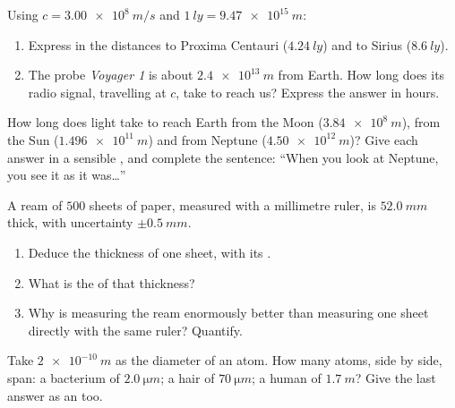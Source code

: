 \begin{exercise}[$\star\star$]\label{exo:g10:orders-of-magnitude:6}
Using $c = \qty{3.00e8}{m/s}$ and $\qty{1}{ly} = \qty{9.47e15}{m}$:
\begin{enumerate}
  \item Express in  the distances to Proxima Centauri
        ($\qty{4.24}{ly}$) and to Sirius ($\qty{8.6}{ly}$).
  \item The probe \emph{Voyager 1} is about $\qty{2.4e13}{m}$ from
        Earth. How long does its radio signal, travelling at $c$, take
        to reach us? Express the answer in hours.
\end{enumerate}
\end{exercise}

\begin{exercise}[$\star\star$]\label{exo:g10:orders-of-magnitude:7}
How long does light take to reach Earth from the Moon
($\qty{3.84e8}{m}$), from the Sun ($\qty{1.496e11}{m}$) and from
Neptune ($\qty{4.50e12}{m}$)? Give each answer in a sensible , and
complete the sentence: ``When you look at Neptune, you see it as it
was\dots''
\end{exercise}

\begin{exercise}[$\star\star$]\label{exo:g10:orders-of-magnitude:8}
A ream of $500$ sheets of paper, measured with a millimetre ruler, is
$\qty{52.0}{mm}$ thick, with uncertainty $\pm\qty{0.5}{mm}$.
\begin{enumerate}
  \item Deduce the thickness of one sheet, with its .
  \item What is the  of that thickness?
  \item Why is measuring the ream enormously better than measuring one
        sheet directly with the same ruler? Quantify.
\end{enumerate}
\end{exercise}

\begin{exercise}[$\star\star$]\label{exo:g10:orders-of-magnitude:9}
Take $\qty{2e-10}{m}$ as the diameter of an atom. How many atoms, side
by side, span: a bacterium of $\qty{2.0}{\micro m}$; a hair of
$\qty{70}{\micro m}$; a human of $\qty{1.7}{m}$? Give the last answer
as an  too.
\end{exercise}

